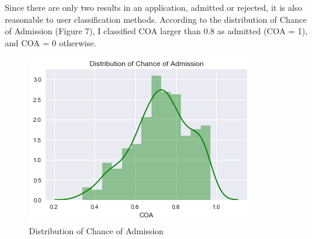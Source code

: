 \documentclass[12pt]{article}
\begin{document}
\begin{sloppypar}
Since there are only two results in an application, admitted or rejected, it is also reasonable to user classification methods. According to the distribution of Chance of Admission (Figure 7), I classified COA larger than 0.8 as admitted (COA = 1), and COA = 0 otherwise.
\begin{figure}[H]
    \centering
    \includegraphics[scale = 0.9]{COA.png}
    \caption{Distribution of Chance of Admission}
\end{figure}

 
 \begin{figure}[H]
 \centering


\end{figure}
\end{sloppypar}
\end{document}
